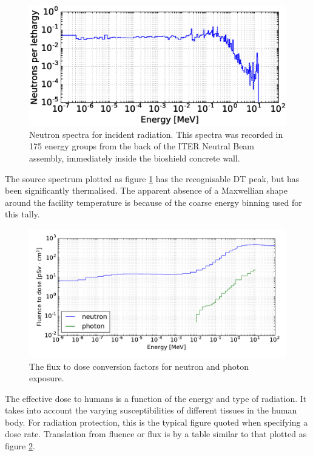 \begin{figure}[H]
	\includegraphics[width=\textwidth]{src_spectra}
	\caption{Neutron spectra for incident radiation. This spectra was recorded in 175 energy groups from the back of the ITER Neutral Beam assembly, immediately inside the bioshield concrete wall.}
	\label{fig:src_spectra}
\end{figure}

The source spectrum plotted as figure \ref{fig:src_spectra} has the recognisable DT peak, but has been significantly thermalised. The apparent absence of a Maxwellian shape around the facility temperature is because of the coarse energy binning used for this tally.

\begin{figure}[H]
	\includegraphics[width=\textwidth]{icrp74}
	\caption{The flux to dose conversion factors for neutron and photon exposure.}
	\label{fig:icrp74}
\end{figure}

The effective dose to humans is a function of the energy and type of radiation. It takes into account the varying susceptibilities of different tissues in the human body. For radiation protection, this is the typical figure quoted when specifying a dose rate. Translation from fluence or flux is by a table similar to that plotted as figure \ref{fig:icrp74}.

